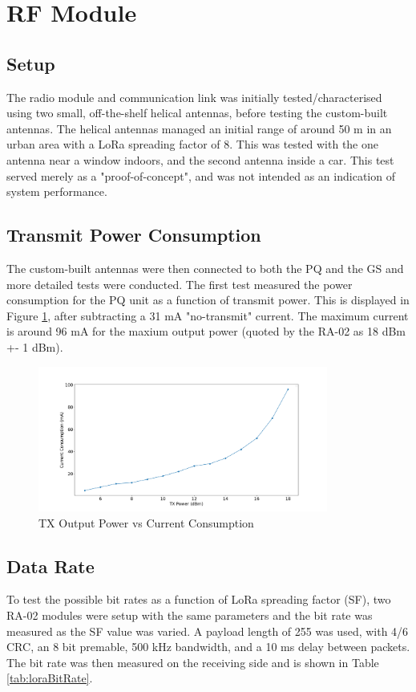 \graphicspath{{./figures}}

\section{RF Module}

\subsection{Setup}
The radio module and communication link was initially tested/characterised using two small, off-the-shelf helical antennas, before testing the custom-built antennas. The helical antennas managed an initial range of around 50 m in an urban area with a LoRa spreading factor of 8. This was tested with the one antenna near a window indoors, and the second antenna inside a car. This test served merely as a "proof-of-concept", and was not intended as an indication of system performance.

\subsection{Transmit Power Consumption}
The custom-built antennas were then connected to both the PQ and the GS and more detailed tests were conducted. The first test measured the power consumption for the PQ unit as a function of transmit power. This is displayed in Figure \ref{fig:txPower}, after subtracting a 31 mA "no-transmit" current. The maximum current is around 96 mA for the maxium output power (quoted by the RA-02 as 18 dBm +- 1 dBm).

\begin{figure}[!htb]
  \centering
  \includegraphics[width=0.85\textwidth]{txPower}
  \caption{TX Output Power vs Current Consumption}
  \label{fig:txPower}
\end{figure}

\subsection{Data Rate}
To test the possible bit rates as a function of LoRa spreading factor (SF), two RA-02 modules were setup with the same parameters and the bit rate was measured as the SF value was varied. A payload length of 255 was used, with 4/6 CRC, an 8 bit premable, 500 kHz bandwidth, and a 10 ms delay between packets. The bit rate was then measured on the receiving side and is shown in Table \ref{tab:loraBitRate}.

